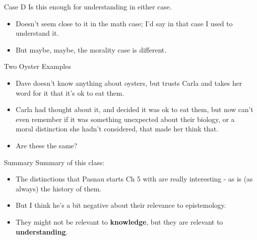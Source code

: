 \documentclass[
  17pt,
  letterpaper,
  ignorenonframetext,
  aspectratio=169,
]{beamer}
\providecommand{\tightlist}{%
  \setlength{\itemsep}{0pt}\setlength{\parskip}{0pt}}\usepackage{longtable,booktabs,array}
\begin{document}
\begin{frame}{Case D}
\protect\hypertarget{case-d}{}
Is this enough for understanding in either case.

\begin{itemize}[<+->]
\tightlist
\item
  Doesn't seem close to it in the math case; I'd say in that case I used
  to understand it.
\item
  But maybe, maybe, the morality case is different.
\end{itemize}
\end{frame}

\begin{frame}{Two Oyster Examples}
\protect\hypertarget{two-oyster-examples}{}
\begin{itemize}[<+->]
\tightlist
\item
  Dave doesn't know anything about oysters, but trusts Carla and takes
  her word for it that it's ok to eat them.
\item
  Carla had thought about it, and decided it was ok to eat them, but now
  can't even remember if it was something unexpected about their
  biology, or a moral distinction she hadn't considered, that made her
  think that.
\item
  Are these the same?
\end{itemize}
\end{frame}

\begin{frame}{Summary}
\protect\hypertarget{summary}{}
Summary of this class:

\begin{itemize}[<+->]
\tightlist
\item
  The distinctions that Pasnau starts Ch 5 with are really interesting -
  as is (as always) the history of them.
\item
  But I think he's a bit negative about their relevance to epistemology.
\item
  They might not be relevant to \textbf{knowledge}, but they are
  relevant to \textbf{understanding}.
\end{itemize}
\end{frame}
\end{document}
